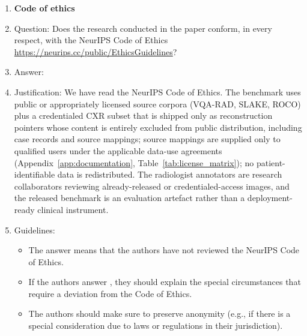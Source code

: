 \documentclass{article}
\providecommand{\DIFaddtex}[1]{{\protect\color{blue} \sf #1}} %
\providecommand{\DIFdeltex}[1]{{\protect\color{red} \scriptsize #1}} %
\providecommand{\DIFaddbegin}{} %
\providecommand{\DIFaddend}{} %
\providecommand{\DIFdelbegin}{} %
\providecommand{\DIFdelend}{} %
\providecommand{\DIFadd}[1]{\texorpdfstring{\DIFaddtex{#1}}{#1}} %
\providecommand{\DIFdel}[1]{\texorpdfstring{\DIFdeltex{#1}}{}} %
\begin{document}
\begin{enumerate}
\item {\bf Code of ethics}
    \item[] Question: Does the research conducted in the paper conform, in every respect, with the NeurIPS Code of Ethics \url{https://neurips.cc/public/EthicsGuidelines}?
    \item[] Answer: \answerYes{}
    \item[] Justification: We have read the NeurIPS Code of Ethics. The benchmark uses public or appropriately licensed source corpora (VQA-RAD, SLAKE, ROCO) plus a credentialed CXR subset \DIFdelbegin \DIFdel{that is shipped only as reconstruction pointers }\DIFdelend \DIFaddbegin \DIFadd{whose content is entirely excluded from public distribution, including case records and source mappings; source mappings are supplied only to qualified users under the applicable data-use agreements }\DIFaddend (Appendix~\ref{app:documentation}, Table~\ref{tab:license_matrix}); no patient-identifiable data is redistributed. The radiologist annotators are research collaborators reviewing already-released or credentialed-access images, and the released benchmark is an evaluation artefact rather than a deployment-ready clinical instrument.
    \item[] Guidelines:
    \begin{itemize}
        \item The answer \answerNA{} means that the authors have not reviewed the NeurIPS Code of Ethics.
        \item If the authors answer \answerNo, they should explain the special circumstances that require a deviation from the Code of Ethics.
        \item The authors should make sure to preserve anonymity (e.g., if there is a special consideration due to laws or regulations in their jurisdiction).
    \end{itemize}



\end{enumerate}
\end{document}
